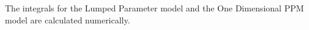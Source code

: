 The integrals for the Lumped Parameter model and the One Dimensional PPM model 
are calculated numerically.

%
%
%      
%
%
%
%
%
%
%
%

